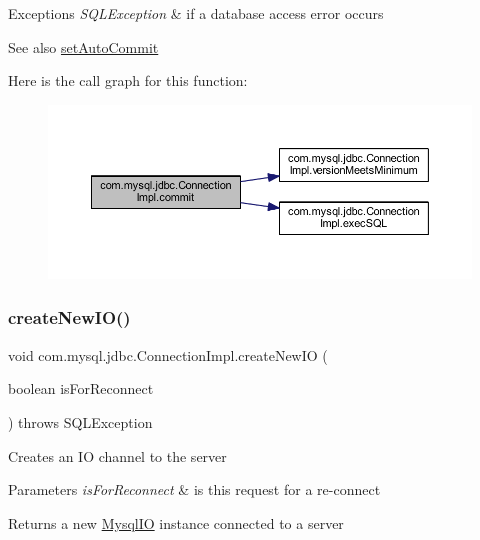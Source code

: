 \begin{DoxyExceptions}{Exceptions}
{\em S\+Q\+L\+Exception} & if a database access error occurs \\
\hline
\end{DoxyExceptions}
\begin{DoxySeeAlso}{See also}
\mbox{\hyperlink{classcom_1_1mysql_1_1jdbc_1_1_connection_impl_aa5a8a261dfc670c3426f7949a56056ca}{set\+Auto\+Commit}} 
\end{DoxySeeAlso}
Here is the call graph for this function\+:\nopagebreak
\begin{figure}[H]
\begin{center}
\leavevmode
\includegraphics[width=350pt]{classcom_1_1mysql_1_1jdbc_1_1_connection_impl_aa2c8c829d30458f22f7785396eb18af1_cgraph}
\end{center}
\end{figure}
\mbox{\label{classcom_1_1mysql_1_1jdbc_1_1_connection_impl_ade9022e02eb0afed7976e6bc0f0b86da}} 
\subsubsection{\texorpdfstring{create\+New\+I\+O()}{createNewIO()}}
{\footnotesize\ttfamily void com.\+mysql.\+jdbc.\+Connection\+Impl.\+create\+New\+IO (\begin{DoxyParamCaption}\item[{boolean}]{is\+For\+Reconnect }\end{DoxyParamCaption}) throws S\+Q\+L\+Exception}

Creates an IO channel to the server


\begin{DoxyParams}{Parameters}
{\em is\+For\+Reconnect} & is this request for a re-\/connect \\
\hline
\end{DoxyParams}
\begin{DoxyReturn}{Returns}
a new \mbox{\hyperlink{classcom_1_1mysql_1_1jdbc_1_1_mysql_i_o}{Mysql\+IO}} instance connected to a server 
\end{DoxyReturn}


